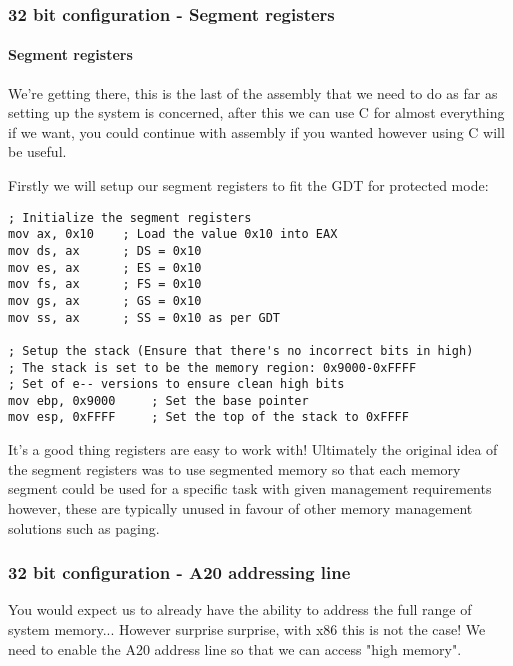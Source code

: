 \documentclass[10pt,a4paper]{article}
\begin{document}
\newpage
\subsubsection{32 bit configuration - Segment registers}
\paragraph{Segment registers\\}
We're getting there, this is the last of the assembly that we need to do as far as setting up the system is concerned, after this we can use C for almost everything if we want, you could continue with assembly if you wanted however using C will be useful.

Firstly we will setup our segment registers to fit the GDT for protected mode:
\begin{verbatim}
; Initialize the segment registers
mov ax, 0x10    ; Load the value 0x10 into EAX
mov ds, ax      ; DS = 0x10
mov es, ax      ; ES = 0x10
mov fs, ax      ; FS = 0x10
mov gs, ax      ; GS = 0x10
mov ss, ax      ; SS = 0x10 as per GDT

; Setup the stack (Ensure that there's no incorrect bits in high)
; The stack is set to be the memory region: 0x9000-0xFFFF
; Set of e-- versions to ensure clean high bits
mov ebp, 0x9000     ; Set the base pointer
mov esp, 0xFFFF     ; Set the top of the stack to 0xFFFF
\end{verbatim}

It's a good thing registers are easy to work with! Ultimately the original idea of the segment registers was to use segmented memory so that each memory segment could be used for a specific task with given management requirements however, these are typically unused in favour of other memory management solutions such as paging.

\newpage
\subsubsection{32 bit configuration - A20 addressing line}

You would expect us to already have the ability to address the full range of system memory... However surprise surprise, with x86 this is not the case! We need to enable the A20 address line so that we can access "high memory".
\end{document}
